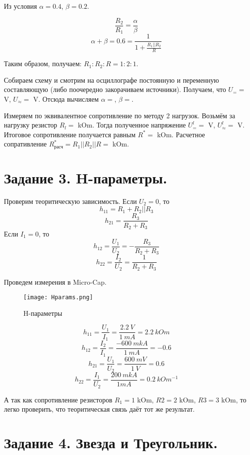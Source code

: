     \noindent Из условия $\alpha = 0.4$, $\beta = 0.2$.

    \[ \frac{R_2}{R_1} = \frac{\alpha}{\beta} \]
    \[ \alpha + \beta = 0.6 = \frac{1}{1 + \frac{R_1 || R_2}{R}} \]

    \noindent Таким образом, получаем: $R_1 : R_2 : R = 1 : 2 : 1$.

    \noindent Собираем схему и смотрим на осциллографе постоянную и 
    переменную составляющую (либо поочередно закорачиваем источники). 
    Получаем, что $U_{=} = $ V, $U_{\approx} = $ V. Отсюда вычисляем $\alpha = $, $\beta = $.

    \noindent Измеряем по эквивалентное сопротивление по методу 2 нагрузок.
    Возьмём за нагрузку резистор $R_l = $ kOm. Тогда полученное напряжение
    $U^l_{=} = $ V, $U^l_{\approx} = $ V.
    Итоговое сопротивление получается равным $R^* = $ kOm. Расчетное сопративление
    $R^*_{\text{расч}} = R_1 || R_2 || R =  $ kOm.

    \section*{Задание 3. H-параметры.}

    \noindent Проверим теоритическую зависимость. Если $U_2 = 0$, то
    \[ h_{11} = R_1 + R_2 || R_3 \]
    \[ h_{21} = \frac{R_3}{R_2 + R_3} \]
    Если $I_1 = 0$, то
    \[ h_{12} = \frac{U_1}{U_2} = - \frac{R_3}{R_2 + R_3} \]
    \[ h_{22} = \frac{I_2}{U_2} = \frac{1}{R_2 + R_3} \] 

    Проведем измерения в Micro-Cap.
    \begin{figure}[h!]
        \centering
        \texttt{[image: Hparams.png]}
        \caption{H-параметры}
    \end{figure}

    \[ h_{11} = \frac{U_1}{I_1} = \frac{2.2 ~ V}{1 ~ mA} = 2.2 ~ kOm \]
    \[ h_{12} = \frac{I_2}{I_1} = \frac{-600 ~ mkA}{1 ~ mA} = -0.6 \]
    \[ h_{21} = \frac{U_1}{U_2} = \frac{600 ~ mV}{1 ~ V} = 0.6 \]
    \[ h_{22} = \frac{I_1}{U_2} = \frac{200 ~ mkA}{1 mA} = 0.2 ~ kOm^{-1} \]

    \noindent А так как сопротивление резисторов $R_1 = 1$ kOm, $R2 = 2$ kOm,
    $R3 = 3$ kOm, то легко проверить, что теоритическая связь даёт тот же
    результат.

    \section*{Задание 4. Звезда и Треугольник.}


